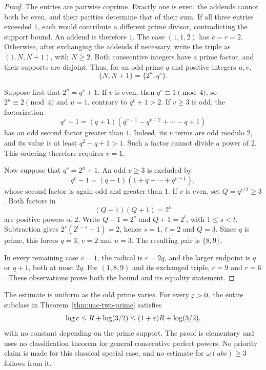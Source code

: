 \begin{proof}
The entries are pairwise coprime. Exactly one is even: the addends
cannot both be even, and their parities determine that of their sum.
If all three entries exceeded $1$, each would contribute a different
prime divisor, contradicting the support bound. An addend is therefore
$1$. The case $(1,1,2)$ has $c=r=2$. Otherwise, after exchanging the
addends if necessary, write the triple as $(1,N,N+1)$, with $N\ge2$.
Both consecutive integers have a prime factor, and their supports are
disjoint. Thus, for an odd prime $q$ and positive integers $u,v$,
\begin{equation}\label{eq:uac-consecutive-powers}
                         \{N,N+1\}=\{2^u,q^v\}.
\end{equation}

Suppose first that $2^u=q^v+1$. If $v$ is even, then
$q^v\equiv1\pmod4$, so $2^u\equiv2\pmod4$ and $u=1$,
contrary to $q^v+1>2$. If $v\ge3$ is odd, the factorization
\[
 q^v+1=(q+1)(q^{v-1}-q^{v-2}+\cdots-q+1)
\]
has an odd second factor greater than $1$. Indeed, its $v$ terms
are odd modulo $2$, and its value is at least $q^2-q+1>1$.
Such a factor cannot divide a power of $2$. This ordering therefore
requires $v=1$.

Now suppose that $q^v=2^u+1$. An odd $v\ge3$ is excluded by
\[
 q^v-1=(q-1)(1+q+\cdots+q^{v-1}),
\]
whose second factor is again odd and greater than $1$.
If $v$ is even, set $Q=q^{v/2}\ge3$. Both factors in
\[
                         (Q-1)(Q+1)=2^u
\]
are positive powers of $2$. Write $Q-1=2^s$ and $Q+1=2^t$,
with $1\le s<t$. Subtraction gives
$2^s(2^{t-s}-1)=2$, hence $s=1$, $t=2$ and $Q=3$.
Since $q$ is prime, this forces $q=3$, $v=2$ and $u=3$.
The resulting pair is $\{8,9\}$.

In every remaining case $v=1$, the radical is $r=2q$, and the
larger endpoint is $q$ or $q+1$, both at most $2q$.
For $(1,8,9)$ and its exchanged triple, $c=9$ and $r=6$.
These observations prove both the bound and its equality statement.
\end{proof}

The estimate is uniform as the odd prime varies. For every $\varepsilon>0$,
the entire subclass in Theorem~\ref{thm:uac-two-prime} satisfies
\[
 \log c\le R+\log(3/2)
        \le(1+\varepsilon)R+\log(3/2),
\]
with no constant depending on the prime support. The proof is elementary
and uses no classification theorem for general consecutive perfect
powers. No priority claim is made for this classical special case, and
no estimate for $\omega(abc)\ge3$ follows from it.

